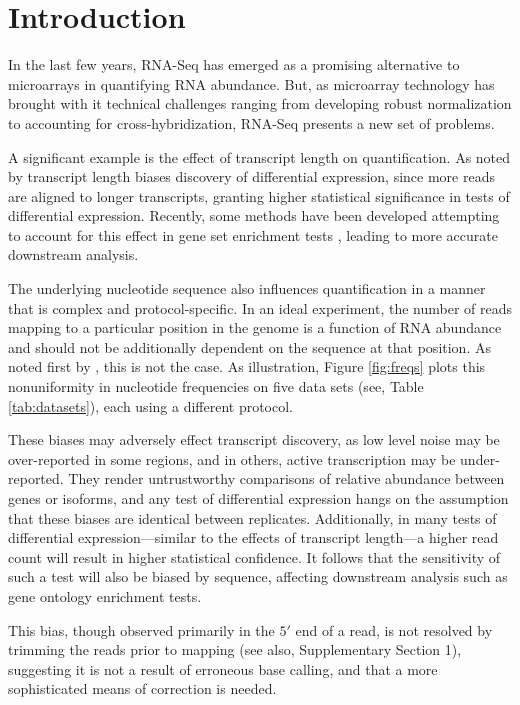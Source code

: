 \documentclass{bioinfo}
\begin{document}
\section{Introduction}

In the last few years, RNA-Seq has emerged as a promising alternative to
microarrays in quantifying RNA abundance. But, as microarray technology has
brought with it technical challenges ranging from developing robust
normalization to accounting for cross-hybridization, RNA-Seq presents a new set
of problems.

A significant example is the effect of transcript length on quantification.  As
noted by \citet{Oshlack2009} transcript length biases discovery of
differential expression, since more reads are aligned to longer transcripts,
granting higher statistical significance in tests of differential expression.
Recently, some methods have been developed attempting to account for this effect
in gene set enrichment tests \citep{Young2010,Gao2011}, leading to more accurate
downstream analysis.

The underlying nucleotide sequence also influences quantification in a manner
that is complex and protocol-specific. In an ideal experiment, the number of
reads mapping to a particular position in the genome is a function of RNA
abundance and should not be additionally dependent on the sequence at that
position. As noted first by \citet{Dohm2008}, this is not the case.  As
illustration, Figure \ref{fig:freqs} plots this nonuniformity in nucleotide
frequencies on five data sets (see, Table \ref{tab:datasets}), each using a
different protocol.


These biases may adversely effect transcript discovery, as low level noise may
be over-reported in some regions, and in others, active transcription may be
under-reported. They render untrustworthy comparisons of relative abundance
between genes or isoforms, and any test of differential expression hangs on the
assumption that these biases are identical between replicates.  Additionally, in
many tests of differential expression---similar to the effects of transcript
length---a higher read count will result in higher statistical confidence. It
follows that the sensitivity of such a test will also be biased by sequence,
affecting downstream analysis such as gene ontology enrichment tests.

This bias, though observed primarily in the $5'$ end of a read, is not resolved by
trimming the reads prior to mapping \citep{Hansen2010} (see also, Supplementary
Section 1), suggesting it is not a result of erroneous base calling, and that a
more sophisticated means of correction is needed.
\end{document}
